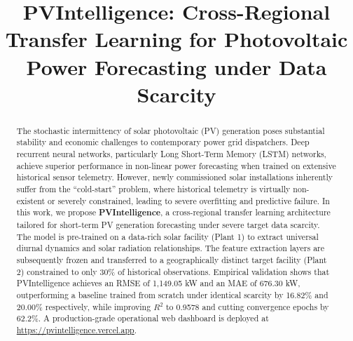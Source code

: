 \documentclass[conference]{IEEEtran}
\begin{document}
\title{PVIntelligence: Cross-Regional Transfer Learning for Photovoltaic Power Forecasting under Data Scarcity}

\author{
}

\maketitle

\begin{abstract}
The stochastic intermittency of solar photovoltaic (PV) generation poses substantial stability and economic challenges to contemporary power grid dispatchers. Deep recurrent neural networks, particularly Long Short-Term Memory (LSTM) networks, achieve superior performance in non-linear power forecasting when trained on extensive historical sensor telemetry. However, newly commissioned solar installations inherently suffer from the ``cold-start'' problem, where historical telemetry is virtually non-existent or severely constrained, leading to severe overfitting and predictive failure. In this work, we propose \textbf{PVIntelligence}, a cross-regional transfer learning architecture tailored for short-term PV generation forecasting under severe target data scarcity. The model is pre-trained on a data-rich solar facility (Plant 1) to extract universal diurnal dynamics and solar radiation relationships. The feature extraction layers are subsequently frozen and transferred to a geographically distinct target facility (Plant 2) constrained to only 30\% of historical observations. Empirical validation shows that PVIntelligence achieves an RMSE of 1,149.05 kW and an MAE of 676.30 kW, outperforming a baseline trained from scratch under identical scarcity by 16.82\% and 20.00\% respectively, while improving $R^2$ to 0.9578 and cutting convergence epochs by 62.2\%. A production-grade operational web dashboard is deployed at \url{https://pvintelligence.vercel.app}.
\end{abstract}
\end{document}
